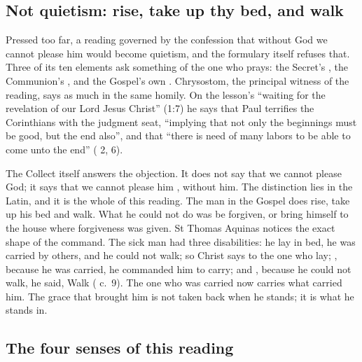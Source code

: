 \subsection{Not quietism: rise, take up thy bed, and walk}

Pressed too far, a reading governed by the confession that without God we
cannot please him would become quietism, and the formulary itself refuses
that. Three of its ten elements ask something of the one who prays: the
Secret's , the Communion's , and the Gospel's own . Chrysostom, the principal witness of the reading, says as much in the
same homily. On the lesson's ``waiting for the revelation of our Lord Jesus
Christ'' (1:7) he says that Paul terrifies the Corinthians with the judgment
seat, ``implying that not only the beginnings must be good, but the end also'',
and that ``there is need of many labors to be able to come unto the end''
( 2, 6).

The Collect itself answers the objection. It does not say that we cannot please
God; it says that we cannot please him , without him. The
distinction lies in the Latin, and it is the whole of this reading. The man in
the Gospel does rise, take up his bed and walk. What he could not do was be
forgiven, or bring himself to the house where forgiveness was given. St Thomas
Aquinas notices the exact shape of the command. The sick man had three
disabilities: he lay in bed, he was carried by others, and he could not walk;
so Christ says  to the one who lay; , because he was carried, he commanded him to carry; and
, because he could not walk, he
said, Walk ( c.~9). The one who was carried now carries what carried
him. The grace that brought him is not taken back when he stands; it is what he
stands in.

\subsection{The four senses of this reading}

